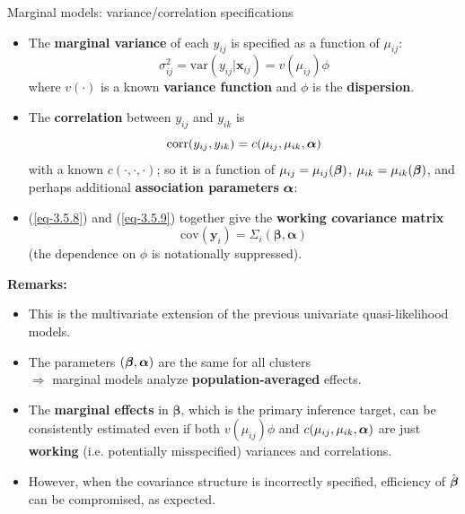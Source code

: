 \documentclass{beamer}
\newcommand{\boldbeta}{{\boldsymbol \beta}}
\newcommand{\boldalpha}{{\boldsymbol \alpha}}
\newenvironment{wideitemize}%
  {\begin{itemize}%
    \setlength{\parskip}{1em}}%
  {\end{itemize}}
\begin{document}
\begin{frame}{\large Marginal models: variance/correlation specifications}

\begin{itemize}
\item
The \textbf{marginal variance} of each $y_{ij}$ is specified as a function of $\mu_{ij}$:
\begin{equation}
\sigma_{ij}^2=\mbox{var}(y_{ij}|\textbf{x}_{ij})=v(\mu_{ij})\phi
\label{eq-3.5.8}
\end{equation}
where $v(\cdot)$ is a  known \textbf{variance function} and $\phi$ is the {\bf dispersion}.
\item
The {\bf correlation} between $y_{ij}$ and $y_{ik}$ is 
\begin{equation}
\mbox{corr}(y_{ij}, y_{ik})=c(\mu_{ij}, \mu_{ik}, \mbox{\boldmath $\alpha$})
\label{eq-3.5.9}
\end{equation}
with a known  $c(\cdot,\cdot,\cdot)$; so it is a function of $\mu_{ij}=\mu_{ij}(\mbox{\boldmath $\beta$})$,
$\mu_{ik}=\mu_{ik}(\mbox{\boldmath $\beta$})$, and perhaps  additional {\bf association parameters}
$\mbox{\boldmath $\alpha$}$:

\item 
(\ref{eq-3.5.8}) and (\ref{eq-3.5.9}) together give the  \textbf{working covariance matrix} \[\mbox{cov}(\textbf{y}_i)
=\Sigma_i(\boldbeta, \boldalpha)\] (the  dependence on  $\phi$ is notationally suppressed).
\end{itemize}

\end{frame}

\begin{frame}
\textbf{Remarks:}
\begin{wideitemize}
\item This is the multivariate extension of the previous univariate quasi-likelihood models.

\item
The parameters $(\mbox{\boldmath $\beta$}, \mbox{\boldmath $\alpha$})$ are the same for all clusters \\
$\Rightarrow$ marginal models analyze \textbf{population-averaged} effects.


\item
The {\bf marginal effects} in  $\boldbeta$, which is the primary inference target, can be consistently estimated even if both $v(\mu_{ij}) \phi$ and  $c(\mu_{ij}, \mu_{ik}, \mbox{\boldmath $\alpha$})$ are just     \textbf{working} (i.e. potentially misspecified) variances and correlations.

\item However, when the covariance structure
is incorrectly specified, efficiency of  $\hat{\mbox{\boldmath $\beta$}}$ can
be compromised, as expected.
\end{wideitemize}

\end{frame}
\end{document}
